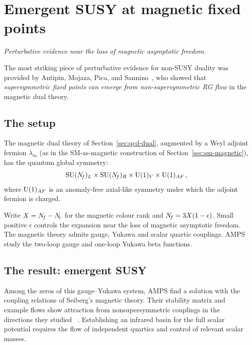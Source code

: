 \documentclass[11pt,a4paper]{article}
\begin{document}
\section{Emergent SUSY at magnetic fixed points}
\label{sec:emergent-susy}

\textit{Perturbative evidence near the loss of magnetic asymptotic freedom.}

The most striking piece of perturbative evidence for non-SUSY duality
was provided by Antipin, Mojaza, Pica, and
Sannino~\cite{AMPS2011}, who showed that \emph{supersymmetric fixed
points can emerge from non-supersymmetric RG flow} in the magnetic
dual theory.

\subsection{The setup}

The magnetic dual theory of Section~\ref{sec:qcd-dual}, augmented by
a Weyl adjoint fermion $\lambda_m$ (as in the SM-as-magnetic
construction of Section~\ref{sec:sm-magnetic}), has the quantum global
symmetry:
\begin{equation}\label{eq:global-sym-magnetic}
  \mathrm{SU}(N_{\!f})_L \times \mathrm{SU}(N_{\!f})_R \times \mathrm{U}(1)_V
  \times \mathrm{U}(1)_{AF}\,,
\end{equation}
where $\mathrm{U}(1)_{AF}$ is an anomaly-free axial-like symmetry under which
the adjoint fermion is charged.

Write $X=N_{\!f}-N_{\!c}$ for the magnetic colour rank and
$N_{\!f}=3X(1-\epsilon)$. Small positive $\epsilon$ controls the
expansion near the loss of magnetic asymptotic freedom. The magnetic
theory admits gauge, Yukawa and scalar quartic couplings. AMPS study
the two-loop gauge and one-loop Yukawa beta functions.

\subsection{The result: emergent SUSY}

Among the zeros of this gauge--Yukawa system, AMPS find a solution
with the coupling relations of Seiberg's magnetic theory. Their
stability matrix and example flows show attraction from
nonsupersymmetric couplings in the directions they studied
~\cite[Tables~V and VII, Fig.~1]{AMPS2011}. Establishing an
infrared basin for the full scalar potential requires the flow of
independent quartics and control of relevant scalar masses.
\end{document}
